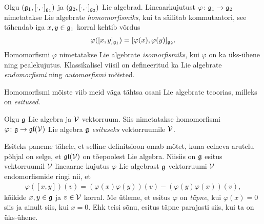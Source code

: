 Olgu $(\mathfrak{g}_1, [\cdot, \cdot]_{\mathfrak{g}_1})$ ja $(\mathfrak{g}_2, [\cdot, \cdot]_{\mathfrak{g}_2})$ Lie
algebrad. Lineaarkujutust $\varphi \colon \mathfrak{g}_1 \to \mathfrak{g}_2$ nimetatakse
Lie algebrate \emph{homomorfismiks}, kui ta säilitab kommutaatori, see
tähendab iga $x, y \in \mathfrak{g}_1$ korral kehtib võrdus
\begin{align*}
    \varphi([x, y]_{\mathfrak{g}_1}) = [\varphi(x), \varphi(y)]_{\mathfrak{g}_2}.
\end{align*}
Homomorfismi $\varphi$ nimetatakse Lie algebrate \emph{isomorfismiks},
kui $\varphi$ on ka üks-ühene ning pealekujutus. Klassikalisel viisil on
defineeritud ka Lie algebrate \emph{endomorfismi} ning \emph{automorfismi}
mõisted.

Homomorfismi mõiste viib meid väga tähtsa osani Lie algebrate teoorias,
milleks on \emph{esitused}.

\begin{dfn}
    Olgu $\mathfrak{g}$ Lie algebra ja $\mathcal{V}$ vektorruum. Siis nimetatakse homomorfismi
    $\varphi \colon \mathfrak{g} \to \mathfrak{gl}(\mathcal{V})$ Lie algebra $\mathfrak{g}$ \emph{esituseks}
    vektorruumile $\mathcal{V}$.
\end{dfn}

Esiteks paneme tähele, et selline definitsioon omab mõtet, kuna
eelneva arutelu põhjal on selge, et $\mathfrak{gl}(\mathcal{V})$ on tõepoolest Lie algebra.
Niisiis on $\mathfrak{g}$ esitus vektorruumil $\mathcal{V}$ lineaarne kujutus $\varphi$
Lie algebrast $\mathfrak{g}$ vektorruumi $\mathcal{V}$ endomorfismide ringi nii, et
\begin{align*}
    \varphi([x, y])(v) = \left( \varphi(x)\varphi(y) \right) (v) -
                         \left( \varphi(y)\varphi(x) \right) (v),
\end{align*}
kõikide $x, y \in \mathfrak{g}$ ja $v \in \mathcal{V}$ korral. Me ütleme, et esitus $\varphi$
on \emph{täpne}, kui $\varphi(x) = 0$ siis ja ainult siis, kui $x = 0$. Ehk
teisi sõnu, esitus täpne parajasti siis, kui ta on üks-ühene.

